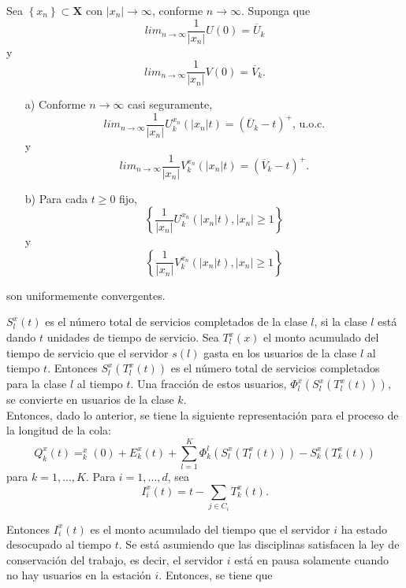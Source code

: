 \begin{Lema}\label{Lema.4.3}
Sea $\left\{x_{n}\right\}\subset \mathbf{X}$ con
$|x_{n}|\rightarrow\infty$, conforme $n\rightarrow\infty$. Suponga
que
\[lim_{n\rightarrow\infty}\frac{1}{|x_{n}|}U\left(0\right)=\overline{U}_{k}\]
y
\[lim_{n\rightarrow\infty}\frac{1}{|x_{n}|}V\left(0\right)=\overline{V}_{k}.\]
\begin{itemize}
\item[a)] Conforme $n\rightarrow\infty$ casi seguramente,
\[lim_{n\rightarrow\infty}\frac{1}{|x_{n}|}U^{x_{n}}_{k}\left(|x_{n}|t\right)=\left(\overline{U}_{k}-t\right)^{+}\textrm{, u.o.c.}\]
y
\[lim_{n\rightarrow\infty}\frac{1}{|x_{n}|}V^{x_{n}}_{k}\left(|x_{n}|t\right)=\left(\overline{V}_{k}-t\right)^{+}.\]

\item[b)] Para cada $t\geq0$ fijo,
\[\left\{\frac{1}{|x_{n}|}U^{x_{n}}_{k}\left(|x_{n}|t\right),|x_{n}|\geq1\right\}\]
y
\[\left\{\frac{1}{|x_{n}|}V^{x_{n}}_{k}\left(|x_{n}|t\right),|x_{n}|\geq1\right\}\]
\end{itemize}
son uniformemente convergentes.
\end{Lema}

$S_{l}^{x}\left(t\right)$ es el n\'umero total de servicios
completados de la clase $l$, si la clase $l$ est\'a dando $t$
unidades de tiempo de servicio. Sea $T_{l}^{x}\left(x\right)$ el
monto acumulado del tiempo de servicio que el servidor
$s\left(l\right)$ gasta en los usuarios de la clase $l$ al tiempo
$t$. Entonces $S_{l}^{x}\left(T_{l}^{x}\left(t\right)\right)$ es
el n\'umero total de servicios completados para la clase $l$ al
tiempo $t$. Una fracci\'on de estos usuarios,
$\Phi_{l}^{x}\left(S_{l}^{x}\left(T_{l}^{x}\left(t\right)\right)\right)$,
se convierte en usuarios de la clase $k$.\\

Entonces, dado lo anterior, se tiene la siguiente representaci\'on
para el proceso de la longitud de la cola:\\

\begin{equation}
Q_{k}^{x}\left(t\right)=_{k}^{x}\left(0\right)+E_{k}^{x}\left(t\right)+\sum_{l=1}^{K}\Phi_{k}^{l}\left(S_{l}^{x}\left(T_{l}^{x}\left(t\right)\right)\right)-S_{k}^{x}\left(T_{k}^{x}\left(t\right)\right)
\end{equation}
para $k=1,\ldots,K$. Para $i=1,\ldots,d$, sea
\[I_{i}^{x}\left(t\right)=t-\sum_{j\in C_{i}}T_{k}^{x}\left(t\right).\]

Entonces $I_{i}^{x}\left(t\right)$ es el monto acumulado del
tiempo que el servidor $i$ ha estado desocupado al tiempo $t$. Se
est\'a asumiendo que las disciplinas satisfacen la ley de
conservaci\'on del trabajo, es decir, el servidor $i$ est\'a en
pausa solamente cuando no hay usuarios en la estaci\'on $i$.
Entonces, se tiene que

